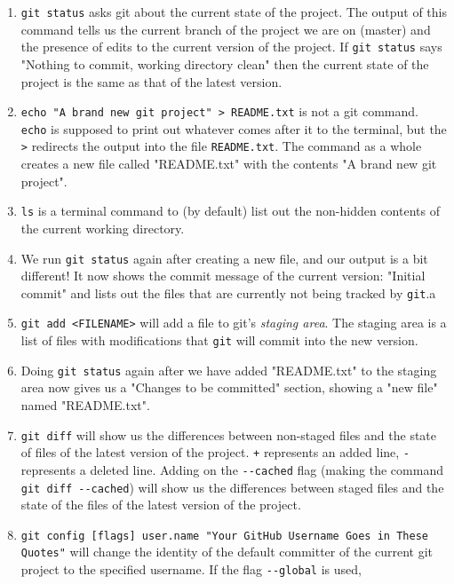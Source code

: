 \documentclass[11pt,fleqn]{article}
\theoremstyle{definition}
\begin{document}
\begin{enumerate}
\item \verb|git status| asks git about the current state of the project. The
    output of this command tells us the current branch of the project we are on
    (master) and the presence of edits to the current version of the project. If
    \verb|git status| says "Nothing to commit, working directory clean" then the
    current state of the project is the same as that of the latest version.
\newpage

\item \verb|echo "A brand new git project" > README.txt| is not a git command.
    \verb|echo| is supposed to print out whatever comes after it to the
    terminal, but the \verb|>| redirects the output into the file
    \verb|README.txt|. The command as a whole creates a new file called
    "README.txt" with the contents "A brand new git project".
\item \verb|ls| is a terminal command to (by default) list out the non-hidden
    contents of the current working directory.
\item We run \verb|git status| again after creating a new file, and our output
    is a bit different! It now shows the commit message of the current version:
    "Initial commit" and lists out the files that are currently not being
    tracked by \verb|git|.a
\item \verb|git add <FILENAME>| will add a file to git's \textit{staging area}.
    The staging area is a list of files with modifications that \verb|git| will
    commit into the new version.
\item Doing \verb|git status| again after we have added "README.txt" to the
    staging area now gives us a "Changes to be committed" section, showing a
    "new file" named "README.txt".
\item \verb|git diff| will show us the differences between non-staged files and
    the state of files of the latest version of the project. \verb|+| represents
    an added line, \verb|-| represents a deleted line. Adding on the
    \verb|--cached| flag (making the command \verb|git diff --cached|) will show
    us the differences between staged files and the state of the files of the
    latest version of the project.
\item \verb|git config [flags] user.name "Your GitHub Username Goes in These Quotes"|
    will change the identity of the default committer of the current
    git project to the specified username. If the flag \verb|--global| is used,

\end{enumerate}
\end{document}
